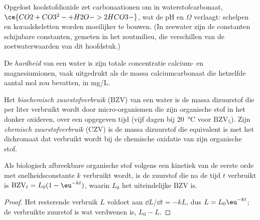 Opgelost koolstofdioxide zet carbonaationen om in waterstofcarbonaat, $\ce{CO2 + CO3^2- + H2O -> 2HCO3-}$,
wat de pH en $\Omega$ verlaagt: schelpen en koraalskeletten worden moeilijker te bouwen. (In
zeewater zijn de constanten schijnbare constanten, gemeten in het
zoutmilieu, die verschillen van de zoetwaterwaarden van dit hoofdstuk.)

\begin{definition}[Waterhardheid]\label{def:b3:environmental-toxicology:hardness}
De \emph{hardheid} van een water is zijn totale
concentratie calcium- en magnesiumionen, vaak uitgedrukt als de massa
calciumcarbonaat die hetzelfde aantal mol zou bevatten, in mg/L.
\end{definition}

\begin{definition}[Zuurstofverbruik]\label{def:b3:environmental-toxicology:oxygen-demand}
Het \emph{biochemisch zuurstofverbruik} (BZV) van een
water is de massa dizuurstof die per liter verbruikt wordt door
micro-organismen die zijn organische stof in het donker oxideren, over
een opgegeven tijd (vijf dagen bij \qty{20}{\celsius} voor $\mathrm{BZV_5}$). Zijn
\emph{chemisch zuurstofverbruik} (CZV)
is de massa dizuurstof die equivalent is met het dichromaat dat verbruikt
wordt bij de chemische oxidatie van zijn organische stof.
\end{definition}

\begin{proposition}\label{prop:b3:environmental-toxicology:bod}
Als biologisch afbreekbare organische stof volgens een kinetiek van de
eerste orde met snelheidsconstante $k$ verbruikt wordt, is de zuurstof die na de tijd $t$ verbruikt is $\mathrm{BZV}_t = L_0(1 - \eu^{-kt})$, waarin $L_0$ het uiteindelijke BZV is.
\end{proposition}

\begin{proof}
Het resterende verbruik $L$ voldoet aan $\dd L/\dd t = -kL$, dus $L = L_0\eu^{-kt}$; de verbruikte zuurstof is wat verdwenen is,
$L_0 - L$.
\end{proof}

